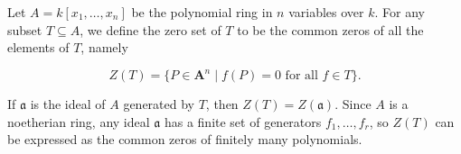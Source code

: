 Let $A = k[x_1, \ldots, x_n]$ be the polynomial ring in $n$ variables over $k$. For any subset $T \subseteq A$, we define the zero set of $T$ to be the common zeros of all the elements of $T$, namely

$$Z(T) = \{P \in \mathbf{A}^n \mid f(P) = 0 \text{ for all } f \in T\}.$$

If $\mathfrak{a}$ is the ideal of $A$ generated by $T$, then $Z(T) = Z(\mathfrak{a})$. Since $A$ is a noetherian ring, any ideal $\mathfrak{a}$ has a finite set of generators $f_1, \ldots, f_r$, so $Z(T)$ can be expressed as the common zeros of finitely many polynomials.

